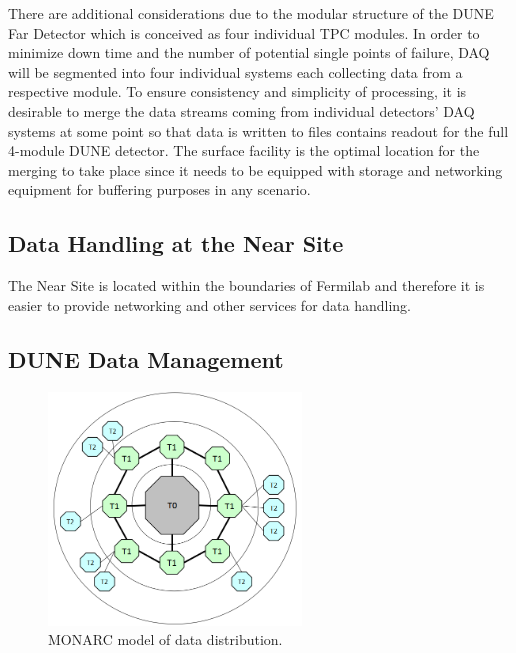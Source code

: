  There are additional considerations due to the modular structure of the DUNE Far Detector
which is conceived as four individual TPC modules. In order to minimize down time and the number of potential single points of failure,
DAQ will be segmented into four individual  systems each collecting data from a respective module. To ensure
consistency and simplicity of processing, it is desirable to merge the data streams coming from individual detectors' DAQ systems
at some point so that data is written to files contains readout for the full 4-module DUNE detector. The surface facility is the optimal location
for the merging to take place since it needs to be equipped with storage and networking equipment for buffering purposes in any scenario.

\subsection{Data Handling at the Near Site}
The Near Site is located within the boundaries of Fermilab and therefore it is easier to provide networking and other services for data handling.

\subsection{DUNE Data Management}

\begin{figure}[h!]
\centering
\includegraphics[width=0.6\textwidth]{monarc-model.png}
\caption{MONARC model of data distribution.}
\label{fig:monarc}
\end{figure}
